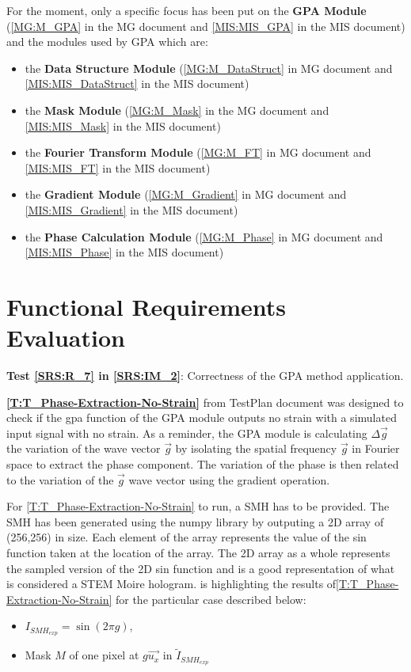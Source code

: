 \documentclass[12pt, titlepage]{article}
\begin{document}
For the moment, only a specific focus has been put on the \textbf{GPA Module} (\cref{MG:M_GPA} in the  MG document and \cref{MIS:MIS_GPA} in the MIS document) and the modules used by GPA which are:
\begin{itemize}
\item the \textbf{Data Structure Module} (\cref{MG:M_DataStruct} in MG document and \cref{MIS:MIS_DataStruct} in the MIS document)
\item the \textbf{Mask Module} (\cref{MG:M_Mask} in the MG document and \cref{MIS:MIS_Mask} in the MIS document)
\item the \textbf{Fourier Transform Module} (\cref{MG:M_FT} in MG document and \cref{MIS:MIS_FT} in the MIS document)
\item the \textbf{Gradient Module} (\cref{MG:M_Gradient} in MG document and \cref{MIS:MIS_Gradient} in the MIS document)
\item the \textbf{Phase Calculation Module} (\cref{MG:M_Phase} in MG document and \cref{MIS:MIS_Phase} in the MIS document)
\end{itemize}

\section{Functional Requirements Evaluation}

\textbf{Test \cref{SRS:R_7} in \cref{SRS:IM_2}}: Correctness of the GPA method application.\medskip

\textbf{\cref{T:T_Phase-Extraction-No-Strain}} from TestPlan document was designed to check if the gpa function of the GPA module outputs no strain with a simulated input signal with no strain. As a reminder, the GPA module is calculating $\Delta \overrightarrow{g}$ the variation of the wave vector $\overrightarrow{g}$ by isolating the spatial frequency $\overrightarrow{g}$ in Fourier space to extract the phase component. The variation of the phase is then related to the variation of the $\overrightarrow{g}$ wave vector using the gradient operation. \medskip

For {\cref{T:T_Phase-Extraction-No-Strain}} to run, a SMH has to be provided. The SMH has been generated using the numpy library by outputing a 2D array of (256,256) in size. Each element of the array represents the value of the sin function taken at the location of the array. The 2D array as a whole represents the sampled version of the 2D sin function and is a good representation of what is considered a STEM Moire hologram.   is highlighting the results of{\cref{T:T_Phase-Extraction-No-Strain}} for the particular case described below:
\begin{itemize}
\item $I_{SMH_{exp}}=\sin{(2\pi g)}$, 
\item Mask $M$ of one pixel at $g\overrightarrow{u_x}$ in $\widetilde{I}_{SMH_{exp}}$
\end{itemize}
\end{document}
